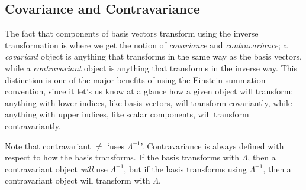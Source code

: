 \subsection{Covariance and Contravariance}
The fact that components of basis vectors transform using the inverse transformation is where we get the notion of \emph{covariance} and \emph{contravariance}; a \emph{covariant} object is anything that transforms in the same way as the basis vectors, while a \emph{contravariant} object is anything that transforms in the inverse way.
This distinction is one of the major benefits of using the Einstein summation convention, since it let's us know at a glance how a given object will transform: anything with lower indices, like basis vectors, will transform covariantly, while anything with upper indices, like scalar components, will transform contravariantly.

Note that contravariant $\not=$ `uses $\Lambda^{-1}$'.
Contravariance is always defined with respect to how the basis transforms.
If the basis transforms with $\Lambda$, then a contravariant object \emph{will} use $\Lambda^{-1}$, but if the basis transforms using $\Lambda^{-1}$, then a contravariant object will transform with $\Lambda$.
